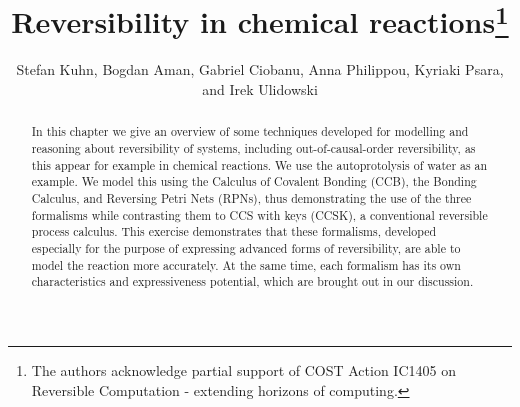\documentclass[runningheads]{llncs}
\begin{document}
%
\title{Reversibility in chemical reactions\thanks{The authors acknowledge partial support of COST Action IC1405 on Reversible Computation - extending horizons of computing.}}
%
%
\author{Stefan Kuhn, Bogdan Aman, Gabriel Ciobanu,  Anna Philippou, Kyriaki Psara, and  Irek Ulidowski}
%
%
%
\maketitle              %
%
\begin{abstract}
In this chapter we give an overview of some techniques developed for modelling and reasoning about reversibility of systems, including out-of-causal-order reversibility, as this appear for example in chemical reactions. We use the autoprotolysis of water as an example. We model this using the Calculus of Covalent Bonding (CCB), the Bonding Calculus, and Reversing Petri Nets (RPNs), thus demonstrating the use of the three formalisms while contrasting them to CCS with keys (CCSK), a conventional reversible process calculus. This exercise demonstrates that these formalisms, developed  especially for the purpose of expressing advanced forms of reversibility, are able to model the reaction more accurately. At the same time, each formalism has its own characteristics and expressiveness potential, which are brought out in our discussion.

\end{abstract}
%
%
%
\end{document}

